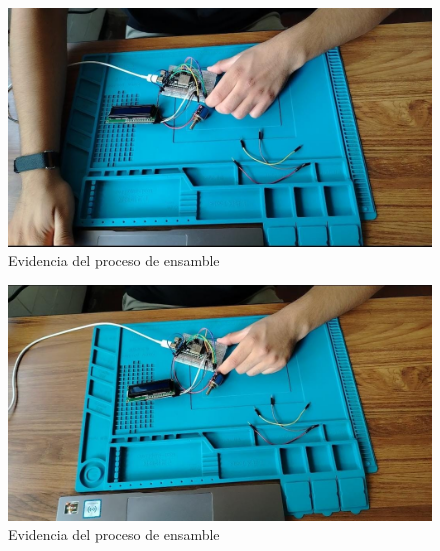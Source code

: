     \begin{figure}[H]
            \centering
            \includegraphics[trim = {0mm 0mm 0mm 0mm},clip,scale=0.2]{12/Img/evidencia3.jpg}
            \caption{Evidencia del proceso de ensamble}
            \label{fig:evidencia3}
    \end{figure}
    
    \begin{figure}[H]
            \centering
            \includegraphics[trim = {0mm 0mm 0mm 0mm},clip,scale=0.2]{12/Img/evidencia4.jpg}
            \caption{Evidencia del proceso de ensamble}
            \label{fig:evidencia4}
    \end{figure}
    
